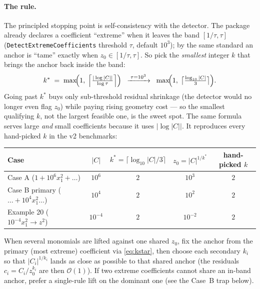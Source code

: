\documentclass[11pt,a4paper]{article}
\begin{document}
\paragraph{The rule.} The principled stopping point is self-consistency with the
detector. The package already declares a coefficient ``extreme'' when it leaves
the band $[1/\tau,\tau]$ (\texttt{DetectExtremeCoefficients} threshold $\tau$,
default $10^3$); by the same standard an anchor is ``tame'' exactly when
$z_0 \in [1/\tau,\tau]$. So pick the \emph{smallest} integer $k$ that brings the
anchor back inside the band:
\begin{equation}\label{eq:kstar}
  k^{*} \;=\; \max\!\Bigl(1,\;\Bigl\lceil \tfrac{|\log|C||}{\log\tau} \Bigr\rceil\Bigr)
  \;\;\xrightarrow{\;\tau=10^3\;}\;\; \max\!\Bigl(1,\;\bigl\lceil \tfrac{\log_{10}|C|}{3} \bigr\rceil\Bigr).
\end{equation}
Going past $k^{*}$ buys only sub-threshold residual shrinkage (the detector would
no longer even flag $z_0$) while paying rising geometry cost --- so the smallest
qualifying $k$, not the largest feasible one, is the sweet spot. The same formula
serves large \emph{and} small coefficients because it uses $|\log|C||$. It
reproduces every hand-picked $k$ in the v2 benchmarks:

\begin{center}\small
\begin{tabular}{l c c c c}
\toprule
Case & $|C|$ & $k^{*}=\lceil\log_{10}|C|/3\rceil$ & $z_0=|C|^{1/k^{*}}$ & hand-picked $k$ \\
\midrule
Case A ($1+10^6x_1^2+\dots$)        & $10^6$    & $2$ & $10^3$    & $2$ \\
Case B primary ($\dots+10^4x_1^2\dots$) & $10^4$ & $2$ & $10^2$    & $2$ \\
Example 20 ($10^{-4}x_1^2\to z^2$)  & $10^{-4}$ & $2$ & $10^{-2}$ & $2$ \\
\bottomrule
\end{tabular}
\end{center}

When several monomials are lifted against one shared $z_0$, fix the anchor from
the primary (most extreme) coefficient via \eqref{eq:kstar}, then choose each
secondary $k_i$ so that $|C_i|^{1/k_i}$ lands as close as possible to that shared
anchor (the residuals $c_i = C_i/z_0^{k_i}$ are then $\mathcal{O}(1)$). If two
extreme coefficients cannot share an in-band anchor, prefer a single-rule lift on
the dominant one (see the Case~B trap below).
\end{document}
